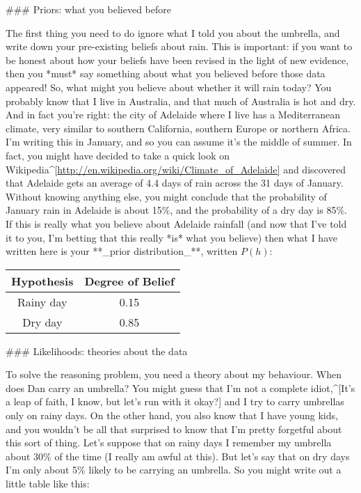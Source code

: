 ### Priors: what you believed before

The first thing you need to do ignore what I told you about the umbrella, and write down your pre-existing beliefs about rain. This is important: if you want to be honest about how your beliefs have been revised in the light of new evidence, then you *must* say something about what you believed before those data appeared! So, what might you believe about whether it will rain today? You probably know that I live in Australia, and that much of Australia is hot and dry. And in fact you're right: the city of Adelaide where I live has a Mediterranean climate, very similar to southern California, southern Europe or northern Africa. I'm writing this in January, and so you can assume it's the middle of summer. In fact, you might have decided to take a quick look on Wikipedia^[\url{http://en.wikipedia.org/wiki/Climate_of_Adelaide]} and discovered that Adelaide gets an average of 4.4 days of rain across the 31 days of January. Without knowing anything else, you might conclude that the probability of January rain in Adelaide is about 15\%, and the probability of a dry day is 85\%. If this is really what you believe about Adelaide rainfall (and now that I've told it to you, I'm betting that this really *is* what you believe) then what I have written here is your **_prior distribution_**, written $P(h)$:

\begin{center}
\begin{tabular}{c|c}
Hypothesis & Degree of Belief \\ \hline
Rainy day & 0.15 \\
Dry day & 0.85
\end{tabular}
\end{center}


### Likelihoods: theories about the data

To solve the reasoning problem, you need a theory about my behaviour. When does Dan carry an umbrella? You might guess that I'm not a complete idiot,^[It's a leap of faith, I know, but let's run with it okay?] and I try to carry umbrellas only on rainy days. On the other hand, you also know that I have young kids, and you wouldn't be all that surprised to know that I'm pretty forgetful about this sort of thing. Let's suppose that on rainy days I remember my umbrella about 30\% of the time (I really am awful at this). But let's say that on dry days I'm only about 5\% likely to be carrying an umbrella. So you might write out a little table like this:

